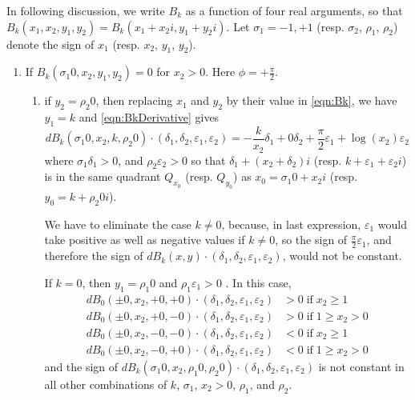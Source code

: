 \documentclass {article}
\renewcommand {\epsilon}{\varepsilon}
\renewcommand {\geq}{\geqslant}
\begin{document}
In following discussion, we write $B_k$ as a function of four real arguments,
so that $B_k(x_1, x_2, y_1, y_2) = B_k(x_1+x_2i, y_1+y_2i)$.
Let $\sigma_1 = -1,+1$ (resp. $\sigma_2$, $\rho_1$, $\rho_2$) denote the sign
of $x_1$ (resp. $x_2$, $y_1$, $y_2$).
\begin {enumerate}
\item If $B_k(\sigma_1 0, x_2, y_1, y_2)=0$ for $x_2 > 0$.
  Here $\phi = +\frac{\pi}{2}$.
  \begin {enumerate}
  \item if $y_2=\rho_2 0$, then replacing $x_1$ and $y_2$ by their value in
    \ref {eqn:Bk}, we have $y_1= k$ and \ref {eqn:BkDerivative} gives
    \[
    dB_k(\sigma_1 0, x_2, k, \rho_2 0)\cdot(\delta_1, \delta_2, \epsilon_1,
    \epsilon_2) = - \frac{k}{x_2} \delta_1 + 0 \delta_2 + \frac{\pi}{2}
    \epsilon_1 + \log(x_2) \epsilon_2
    \]
    where $\sigma_1 \delta_1 > 0$, and $\rho_2 \epsilon_2 > 0$ so that
    $\delta_1 + (x_2 + \delta_2)i$ (resp. $k+\epsilon_1 + \epsilon_2 i$) is in
    the same quadrant $Q_{x_0}$ (resp.  $Q_{y_0}$) as $x_0=\sigma_1 0 +x_2 i$
    (resp. $y_0=k +\rho_2 0i$).

    We have to eliminate the case $k \neq 0$, because, in last expression,
    $\epsilon_1$ would take positive as well as negative values if $k \neq 0$,
    so the sign of $\frac{\pi}{2} \epsilon_1$, and therefore the sign of
    $dB_k(x, y)\cdot (\delta_1, \delta_2, \epsilon_1, \epsilon_2)$, would not
    be constant.

    If $k=0$, then $y_1=\rho_1 0$ and $\rho_1 \epsilon_1 > 0$ .
    In this case,
    \begin {align*}
      dB_0(\pm 0, x_2, +0, +0)\cdot(\delta_1, \delta_2, \epsilon_1,
      \epsilon_2) &> 0 \;\text{if}\; x_2 \geq 1 \\
      dB_0(\pm 0, x_2, +0, -0)\cdot(\delta_1, \delta_2, \epsilon_1,
      \epsilon_2) &> 0 \;\text{if}\; 1 \geq x_2 > 0 \\
      dB_0(\pm 0, x_2, -0, -0)\cdot(\delta_1, \delta_2, \epsilon_1,
      \epsilon_2) &< 0 \;\text{if}\;  x_2 \geq 1 \\
      dB_0(\pm 0, x_2, -0, +0)\cdot(\delta_1, \delta_2, \epsilon_1,
      \epsilon_2) &< 0 \;\text{if}\; 1 \geq x_2 > 0
    \end {align*}
    and the sign of $dB_k(\sigma_1 0, x_2, \rho_1 0, \rho_2 0)\cdot(\delta_1,
    \delta_2, \epsilon_1, \epsilon_2)$ is not constant in all other
    combinations of $k$, $\sigma_1$, $x_2>0$, $\rho_1$, and $\rho_2$.


\end{enumerate}
\end{enumerate}
\end{document}
